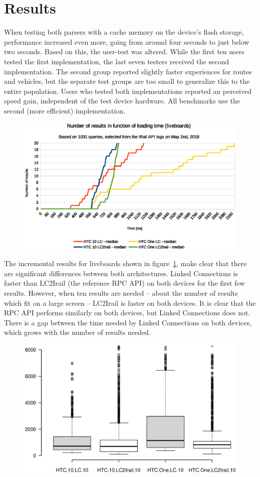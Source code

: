 \documentclass[twocolumn]{phdsymp} %
\begin{document}
\section{Results}

When testing both parsers with a cache memory on the device’s flash storage, performance increased even more, going from around four seconds to just below two seconds. Based on this, the user-test was altered. While the first ten users tested the first implementation, the last seven testers received the second implementation. The second group reported slightly faster experiences for routes and vehicles, but the separate test groups are too small to generalize this to the entire population. Users who tested both implementations reported an perceived speed gain, independent of the test device hardware. All benchmarks use the second (more efficient) implementation.


\begin{figure}[ht]
	\begin{center}
		\includegraphics[width=.50\textwidth]{images/dief_liveboards_average.eps}
		\caption{\label{fig:liveboard} }
	\end{center}
\end{figure}

The incremental results for liveboards shown in figure~\ref{fig:liveboard}, make clear that there are significant differences between both architectures. Linked Connections is faster than LC2Irail (the reference RPC API) on both devices for the first few results. However, when ten results are needed – about the number of results which fit on a large screen – LC2Irail is faster on both devices. It is clear that the RPC API performs similarly on both devices, but Linked Connections does not. There is a gap between the time needed by Linked Connections on both devices, which grows with the number of results needed.

\begin{figure}[ht]
	\begin{center}
		\includegraphics[trim=3cm 4cm 0 0, width=.50\textwidth]{images/boxplot_liveboards_10.eps}
		\caption{\label{fig:liveboardboxplot} }
	\end{center}
\end{figure}
\end{document}
